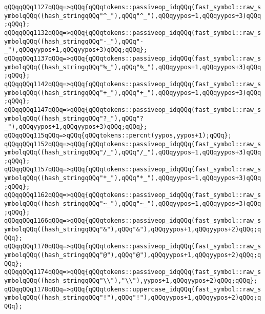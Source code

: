 \verb|qQQqqQQq1127qQQq=>qQQq{qQQqtokens::passiveop_idqQQq(fast_symbol::raw_symbolqQQq((hash_stringqQQq"^_"),qQQq"^_"),qQQqyypos+1,qQQqyypos+3)qQQq;qQQq};|\newline
\verb|qQQqqQQq1132qQQq=>qQQq{qQQqtokens::passiveop_idqQQq(fast_symbol::raw_symbolqQQq((hash_stringqQQq"-_"),qQQq"-_"),qQQqyypos+1,qQQqyypos+3)qQQq;qQQq};|\newline
\verb|qQQqqQQq1137qQQq=>qQQq{qQQqtokens::passiveop_idqQQq(fast_symbol::raw_symbolqQQq((hash_stringqQQq"%_"),qQQq"%_"),qQQqyypos+1,qQQqyypos+3)qQQq;qQQq};|\newline
\verb|qQQqqQQq1142qQQq=>qQQq{qQQqtokens::passiveop_idqQQq(fast_symbol::raw_symbolqQQq((hash_stringqQQq"+_"),qQQq"+_"),qQQqyypos+1,qQQqyypos+3)qQQq;qQQq};|\newline
\verb|qQQqqQQq1147qQQq=>qQQq{qQQqtokens::passiveop_idqQQq(fast_symbol::raw_symbolqQQq((hash_stringqQQq"?_"),qQQq"?_"),qQQqyypos+1,qQQqyypos+3)qQQq;qQQq};|\newline
\verb|qQQqqQQq115qQQq=>qQQq{qQQqtokens::percnt(yypos,yypos+1);qQQq};|\newline
\verb|qQQqqQQq1152qQQq=>qQQq{qQQqtokens::passiveop_idqQQq(fast_symbol::raw_symbolqQQq((hash_stringqQQq"/_"),qQQq"/_"),qQQqyypos+1,qQQqyypos+3)qQQq;qQQq};|\newline
\verb|qQQqqQQq1157qQQq=>qQQq{qQQqtokens::passiveop_idqQQq(fast_symbol::raw_symbolqQQq((hash_stringqQQq"*_"),qQQq"*_"),qQQqyypos+1,qQQqyypos+3)qQQq;qQQq};|\newline
\verb|qQQqqQQq1162qQQq=>qQQq{qQQqtokens::passiveop_idqQQq(fast_symbol::raw_symbolqQQq((hash_stringqQQq"~_"),qQQq"~_"),qQQqyypos+1,qQQqyypos+3)qQQq;qQQq};|\newline
\verb|qQQqqQQq1166qQQq=>qQQq{qQQqtokens::passiveop_idqQQq(fast_symbol::raw_symbolqQQq((hash_stringqQQq"&"),qQQq"&"),qQQqyypos+1,qQQqyypos+2)qQQq;qQQq};|\newline
\verb|qQQqqQQq1170qQQq=>qQQq{qQQqtokens::passiveop_idqQQq(fast_symbol::raw_symbolqQQq((hash_stringqQQq"@"),qQQq"@"),qQQqyypos+1,qQQqyypos+2)qQQq;qQQq};|\newline
\verb|qQQqqQQq1174qQQq=>qQQq{qQQqtokens::passiveop_idqQQq(fast_symbol::raw_symbolqQQq((hash_stringqQQq"\\"),"\\"),yypos+1,qQQqyypos+2)qQQq;qQQq};|\newline
\verb|qQQqqQQq1178qQQq=>qQQq{qQQqtokens::uppercase_idqQQq(fast_symbol::raw_symbolqQQq((hash_stringqQQq"!"),qQQq"!"),qQQqyypos+1,qQQqyypos+2)qQQq;qQQq};|\newline
